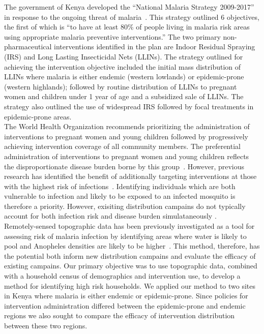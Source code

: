 \documentclass{article}\usepackage[]{graphicx}\usepackage[]{color}
\begin{document}
The government of Kenya developed the “National Malaria Strategy 2009-2017” in response to the ongoing threat of malaria~\cite{CITE3}. This strategy outlined 6 objectives,  the first of which is “to have at least 80\% of people living in malaria risk areas using appropriate malaria preventive interventions.” The two primary non-pharmaceutical interventions identified in the plan are Indoor Residual Spraying (IRS) and Long Lasting Insecticidal Nets (LLINs). The strategy outlined for achieving the intervention objective included the initial mass distribution of LLINs where malaria is either endemic (western lowlands) or epidemic-prone (western highlands); followed by routine distribution of LLINs to pregnant women and children under 1 year of age and a subsidized sale of LLINs. The strategy also outlined the use of widespread IRS followed by focal treatments in epidemic-prone areas.\\

The World Health Organization recommends prioritizing the administration of interventions to pregnant women and young children followed by progressively achieving intervention coverage of all community members. The preferential administration of interventions to pregnant women and young children reflects the disproportionate disease burden borne by this group~\cite{CITE4}. However,  previous research has identified the benefit of additionally targeting interventions at those with the highest risk of infections~\cite{CITE2}. Identifying individuals which are both vulnerable to infection and likely to be exposed to an infected mosquito is therefore a priority.  However, exisiting distribution campains do not typically account for both infection risk and disease burden simulataneously \cite{NEWCITE}.\\  

Remotely-sensed topographic data has been previously investigated as a tool for assessing risk of malaria infection by identifying areas where water is likely to pool and Anopheles densities are likely to be higher~\cite{CITE 5, 6}. This method, therefore, has the potential both inform new distribution campains and evaluate the efficacy of existing campains. Our primary objective was to use topographic data, combined with a household census of demographics and intervention use,  to develop a method for identifying high risk households.  We applied our method to two sites in Kenya where malaria is either endemic or epidemic-prone.  Since policies for intervention administration differed between the epidemic-prone and endemic regions we also sought to compare the efficacy of intervention distribution between these two regions.\\
\end{document}
